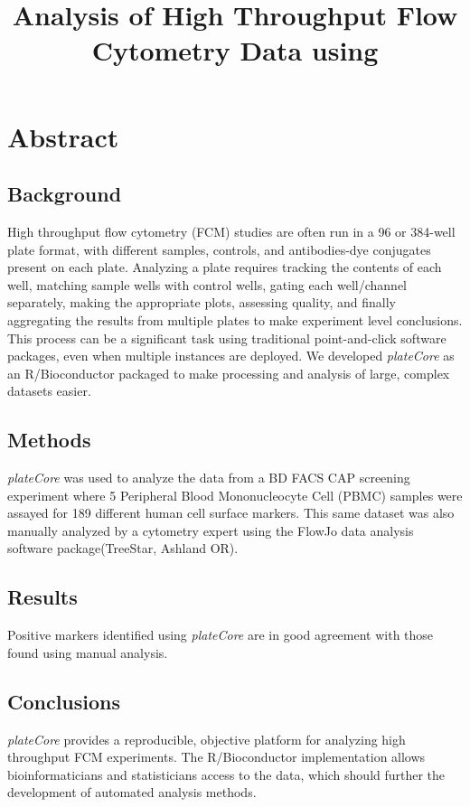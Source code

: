 \documentclass[12pt]{article}
\title{Analysis of High Throughput Flow Cytometry Data using
\Rpackage{plateCore}}
\newcommand{\Rpackage}[1]{{\textit{#1}}}
\begin{document}
\maketitle

\clearpage
\section*{Abstract}
\subsection*{Background}
High throughput flow cytometry (FCM) studies are often run in a 96 or 384-well
plate format, with different samples, controls, and antibodies-dye conjugates
present on each plate. Analyzing a plate requires tracking the contents of each
well, matching sample wells with control wells, gating each well/channel
separately, making the appropriate plots, assessing quality, and finally
aggregating the results from multiple plates to make experiment level
conclusions. This process can be a significant task using traditional
point-and-click software packages, even when multiple instances are deployed.
We developed \Rpackage{plateCore} as an R/Bioconductor packaged to make
processing and analysis of large, complex datasets easier.

\subsection*{Methods}
\Rpackage{plateCore} was used to analyze the data from a BD FACS CAP screening
experiment where 5 Peripheral Blood Mononucleocyte Cell (PBMC) samples  were
assayed for 189 different human cell surface markers. This same dataset was
also manually analyzed by a cytometry expert using the FlowJo data analysis
software package(TreeStar, Ashland OR).

\subsection*{Results}
Positive markers identified using \Rpackage{plateCore} are in good agreement
with those found using manual analysis.

\subsection*{Conclusions}
\Rpackage{plateCore} provides a reproducible, objective platform for analyzing
high throughput FCM experiments. The R/Bioconductor implementation allows
bioinformaticians and statisticians access to the data, which should further
the development of automated analysis methods.
\end{document}
